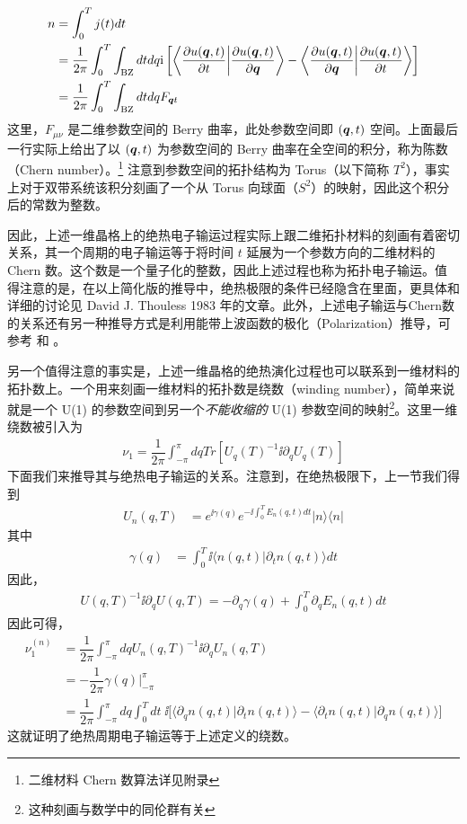 \begin{align}
n &= \int_0^Tj(t)dt \\
& = \frac{1}{2\pi}\int_0^T\int_{\text{BZ}}dtdq \mathrm{i}\left[\left\langle\dfrac{\partial u(\boldsymbol{q},t)}{\partial t}\bigg|\dfrac{\partial u(\boldsymbol{q},t)}{\partial\boldsymbol{q}}\right\rangle - \left\langle\dfrac{\partial u(\boldsymbol{q},t)}{\partial\boldsymbol{q}}\bigg|\dfrac{\partial u(\boldsymbol{q},t)}{\partial t}\right\rangle\right] \\ 
& = \frac{1}{2\pi}\int_0^T\int_{\text{BZ}}dtdq F_{\boldsymbol{q}t}\label{Chern}
\end{align}
这里，$F_{\mu\nu}$ 是二维参数空间的 Berry 曲率，此处参数空间即 $(\boldsymbol{q}, t)$ 空间。上面最后一行实际上给出了以 $(\boldsymbol{q}, t)$ 为参数空间的 Berry 曲率在全空间的积分，称为陈数（Chern number）。\footnote{二维材料 Chern 数算法详见附录} 注意到参数空间的拓扑结构为 Torus（以下简称 $T^2$），事实上对于双带系统该积分刻画了一个从 Torus 向球面（$S^2$）的映射，因此这个积分后的常数为整数。


因此，上述一维晶格上的绝热电子输运过程实际上跟二维拓扑材料的刻画有着密切关系，其一个周期的电子输运等于将时间 $t$ 延展为一个参数方向的二维材料的 Chern 数。这个数是一个量子化的整数，因此上述过程也称为拓扑电子输运。值得注意的是，在以上简化版的推导中，绝热极限的条件已经隐含在里面，更具体和详细的讨论见 David J. Thouless 1983 年的文章。此外，上述电子输运与Chern数的关系还有另一种推导方式是利用能带上波函数的极化（Polarization）推导，可参考 和 。

另一个值得注意的事实是，上述一维晶格的绝热演化过程也可以联系到一维材料的拓扑数上。一个用来刻画一维材料的拓扑数是绕数（winding number），简单来说就是一个 U(1) 的参数空间到另一个\textit{不能收缩的} U(1) 参数空间的映射\footnote{这种刻画与数学中的同伦群有关}。这里一维绕数被引入为\cite{kitagawa2010}
\begin{align}
\nu_1=\dfrac{1}{2\pi}\int_{-\pi}^{\pi}dq Tr[U_q(T)^{-1}\ii\partial_qU_q(T)]\label{wind}
\end{align}
下面我们来推导其与绝热电子输运的关系。注意到，在绝热极限下，上一节我们得到
\begin{align}
U_n(q,T) &= e^{\ii\gamma(q)}e^{-\ii\int_0^TE_n(q,t)dt}|n\rangle\langle n|
\end{align}
其中
\begin{align}
\gamma(q) &=\int_0^T\ii\langle n(q,t)|\partial_tn(q,t)\rangle dt
\end{align}
因此，
\begin{align}
U(q,T)^{-1}\ii\partial_qU(q,T)=-\partial_q\gamma(q)+\int_0^T\partial_qE_n(q,t)dt
\end{align}
因此可得，
\begin{align}
\nu_1^{(n)}&= \dfrac{1}{2\pi}\int_{-\pi}^{\pi}dq U_n(q,T)^{-1}\ii\partial_qU_n(q,T)\\
&= -\dfrac{1}{2\pi}\gamma(q)\bigg|_{-\pi}^{\pi}\\
&= \dfrac{1}{2\pi}\int_{-\pi}^{\pi}dq\int_0^Tdt\;\ii\bigg[\langle\partial_qn(q,t)|\partial_tn(q,t)\rangle-\langle\partial_tn(q,t)|\partial_qn(q,t)\rangle\bigg]
\end{align}
这就证明了绝热周期电子输运等于上述定义的绕数。

